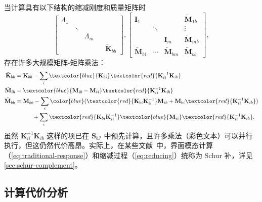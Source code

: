 当计算具有以下结构的缩减刚度和质量矩阵时
\begin{equation}
  \begin{bmatrix}
    \Lambda_{1} &&&&\\
    &\ddots&&&\\
    &&\Lambda_{m}&&\\
    &&&&\tilde{\mathbf{K}}_{bb}
  \end{bmatrix},
  \begin{bmatrix}
    \mathbf{I}_{1} & & & \tilde{\mathbf{M}}_{1b}\\
    &\ddots & & \vdots\\
    & & \mathbf{I}_{m} & \tilde{\mathbf{M}}_{mb}\\
    \tilde{\mathbf{M}}_{b1} &\cdots &\tilde{\mathbf{M}}_{bm} &\tilde{\mathbf{M}}_{bb}
  \end{bmatrix},
\end{equation}
存在许多大规模矩阵-矩阵乘法：
\begin{equation}
  \begin{split}
    \tilde{\mathbf{K}}_{bb} &= \mathbf{K}_{bb} - \sum_i{\textcolor{blue}{\mathbf{K}_{bi}}
      \textcolor{red}{\mathbf{K}_{ii}^{-1} \mathbf{K}_{ib}}}\\
    \tilde{\mathbf{M}}_{ib} &= \textcolor{blue}{\mathbf{M}_{ib} -
    \mathbf{M}_{ii}} \textcolor{red}{\mathbf{K}_{ii}^{-1}\mathbf{K}_{ib}}\\
    \tilde{\mathbf{M}}_{bb} &= \mathbf{M}_{bb} - \sum_i{\color{blue} (\textcolor{red}{\mathbf{K}_{bi}
\mathbf{K}_{ii}^{-1}} \mathbf{M}_{ib} + \mathbf{M}_{bi} \textcolor{red}{\mathbf{K}_{ii}^{-1}
\mathbf{K}_{ib}})}\\
&\quad\quad\quad+\sum_i \textcolor{red}
    {\mathbf{K}_{bi}\mathbf{K}_{ii}^{-1}}\textcolor{blue}{\mathbf{M}_{ii}}
\textcolor{red}{\mathbf{K}_{ii}^{-1} \mathbf{K}_{ib}}.
  \end{split}
  \label{eq:reducing}
\end{equation}
虽然 $\mathbf{K}_{ii}^{-1}\mathbf{K}_{ib}$ 这样的项已在 $\mathbf{S}_{b\mathcal{I}}$ 中预先计算，且许多乘法（彩色文本）可以并行执行，但这仍然代价高昂。实际上，在某些文献~\cite{aristidou2013dynamic}中，界面模态计算（\cref{eq:traditional-response}）和缩减过程（\cref{eq:reducing}）统称为 Schur 补，详见 \cref{sec:schur-complement}。


\subsection{计算代价分析}

